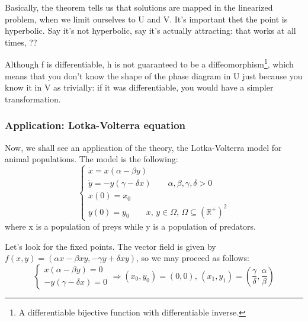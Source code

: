 Basically, the theorem tells us that solutions are mapped in the linearized problem, when we limit ourselves to U and V. It's important thet the point is hyperbolic. Say it's not hyperbolic, say it's actually attracting: that works at all times, ??

\begin{observation}
    Although f is differentiable, h is not guaranteed to be a diffeomorphism\footnote{A differentiable bijective function with differentiable inverse.}, which means that you don't know the shape of the phase diagram in U just because you know it in V as trivially: if it was differentiable, you would have a simpler transformation.
\end{observation}

\subsubsection{Application: Lotka-Volterra equation}
Now, we shall see an application of the theory, the Lotka-Volterra model for animal populations. The model is the following:
\begin{equation*}
    \begin{cases}
        \dot{x}=x(\alpha-\beta y) \\
        \dot{y}=-y(\gamma-\delta x) \qquad \alpha, \beta, \gamma, \delta >0 \\
        x(0)=x_0 \\
        y(0)=y_0 \qquad x,\, y \in \Omega,\, \Omega\subseteq (\mathbb{R}^+)^2
    \end{cases}
\end{equation*}
where x is a population of preys while y is a population of predators.

Let's look for the fixed points. The vector field is given by $f(x, y)=\left(\alpha x- \beta xy, -\gamma y+\delta xy\right)$, so we may proceed as follows: \begin{equation*}
    \begin{cases}
        x(\alpha -\beta y)=0 \\
        -y(\gamma-\delta x)=0 
    \end{cases} \Rightarrow (x_0,y_0)=(0, 0),\, (x_1, y_1)=\left(\frac{\gamma}{\delta}, \frac{\alpha}{\beta}\right)
\end{equation*}

